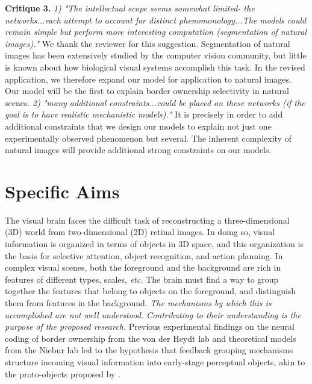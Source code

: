 \documentclass[11pt,notitlepage]{article}
\newcommand{\etc}[0]{{\em etc.}\xspace}
\begin{document}
\textbf{Critique 3.} \textit{1) "The intellectual scope seems somewhat
  limited- the networks...each attempt to account for distinct
  phenomonology...The models could remain simple but perform more
  interesting computation (segmentation of natural images)."} We thank
the reviewer for this suggestion. 
Segmentation of
natural images has been extensively studied by the computer vision
community, but little is known about how biological visual systems
accomplish this task. In the revised application, we therefore
expand our model for application to natural images.
Our model will be the first to explain border ownership
selectivity in natural scenes.
%
\textit{2) "many additional constraints...could be placed on these
  networks (if the goal is to have realistic mechanistic models)."} It
is precisely in order to add additional constraints that we design our
models to explain not just one experimentally observed phenomenon but
several. The inherent complexity of natural images will provide
additional strong constraints on our models.

\clearpage

\section*{Specific Aims}
The visual brain faces the difficult task of reconstructing a
three-dimensional (3D) world from two-dimensional (2D) retinal
images. In doing so, visual information is organized in terms of
objects in 3D space, and this organization is the basis for selective
attention, object recognition, and action planning. In complex visual
scenes, both the foreground and the background are rich in
    features of different types, scales, \etc
The brain must find a way to group together the features that belong
to objects on the foreground, and distinguish them from features in the background.
{\em The mechanisms by which this is accomplished are not well understood. Contributing to their understanding is the purpose of the proposed research.}
Previous experimental findings on the neural coding of border
ownership from the von der Heydt lab and theoretical models from the
Niebur lab led to the hypothesis that
feedback grouping mechanisms
structure incoming visual information into early-stage perceptual
objects,
akin to the proto-objects proposed by \citet{Rensink00a}. 
\end{document}

